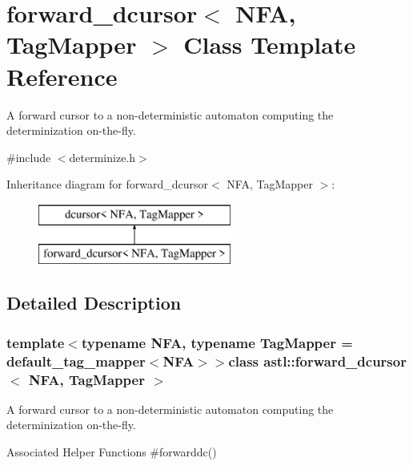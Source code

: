 \section{forward\+\_\+dcursor$<$ N\+F\+A, Tag\+Mapper $>$ Class Template Reference}
\label{classastl_1_1forward__dcursor}


A forward cursor to a non-\/deterministic automaton computing the determinization on-\/the-\/fly.  




{\ttfamily \#include $<$determinize.\+h$>$}

Inheritance diagram for forward\+\_\+dcursor$<$ N\+F\+A, Tag\+Mapper $>$\+:\begin{figure}[H]
\begin{center}
\leavevmode
\includegraphics[height=2.000000cm]{classastl_1_1forward__dcursor}
\end{center}
\end{figure}


\subsection{Detailed Description}
\subsubsection*{template$<$typename N\+F\+A, typename Tag\+Mapper = default\+\_\+tag\+\_\+mapper$<$\+N\+F\+A$>$$>$class astl\+::forward\+\_\+dcursor$<$ N\+F\+A, Tag\+Mapper $>$}

A forward cursor to a non-\/deterministic automaton computing the determinization on-\/the-\/fly. 

\begin{DoxyParagraph}{Associated Helper Functions}
\#forwarddc() 
\end{DoxyParagraph}
